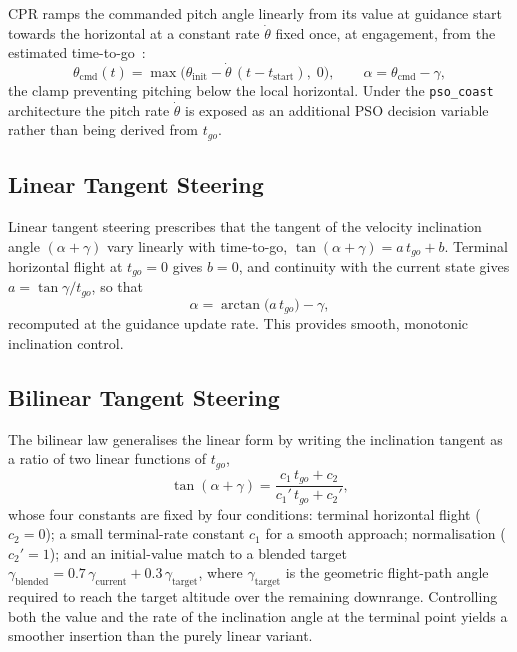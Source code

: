 CPR ramps the commanded pitch angle linearly from its value at guidance start
towards the horizontal at a constant rate $\dot\theta$ fixed once, at engagement,
from the estimated time-to-go~\cite{Ulrich}:
\begin{equation}
  \theta_{\mathrm{cmd}}(t) = \max\!\bigl(\theta_{\mathrm{init}}
        - \dot\theta\,(t - t_{\mathrm{start}}),\; 0\bigr),
  \qquad
  \alpha = \theta_{\mathrm{cmd}} - \gamma,
  \label{eq:cpr}
\end{equation}
the clamp preventing pitching below the local horizontal. Under the
\texttt{pso\_coast} architecture the pitch rate $\dot\theta$ is exposed as an
additional PSO decision variable rather than being derived from $t_{go}$.

\subsection{Linear Tangent Steering}
\label{ssec:lts}

Linear tangent steering prescribes that the tangent of the velocity inclination
angle $(\alpha+\gamma)$ vary linearly with time-to-go,
$\tan(\alpha+\gamma)=a\,t_{go}+b$. Terminal horizontal flight at $t_{go}=0$ gives
$b=0$, and continuity with the current state gives $a=\tan\gamma/t_{go}$, so that
\begin{equation}
  \alpha = \arctan\!\bigl(a\,t_{go}\bigr) - \gamma,
  \label{eq:lts_alpha}
\end{equation}
recomputed at the guidance update rate. This provides smooth, monotonic
inclination control.

\subsection{Bilinear Tangent Steering}
\label{ssec:bts}

The bilinear law generalises the linear form by writing the inclination tangent
as a ratio of two linear functions of $t_{go}$,
\begin{equation}
  \tan(\alpha+\gamma)
    = \frac{c_1\,t_{go} + c_2}{c_1'\,t_{go} + c_2'},
  \label{eq:bts}
\end{equation}
whose four constants are fixed by four conditions: terminal horizontal flight
($c_2=0$); a small terminal-rate constant $c_1$ for a smooth approach;
normalisation ($c_2'=1$); and an initial-value match to a blended target
$\gamma_{\mathrm{blended}}=0.7\,\gamma_{\mathrm{current}}+0.3\,\gamma_{\mathrm{target}}$,
where $\gamma_{\mathrm{target}}$ is the geometric flight-path angle required to
reach the target altitude over the remaining downrange. Controlling both the
value and the rate of the inclination angle at the terminal point yields a
smoother insertion than the purely linear variant.

